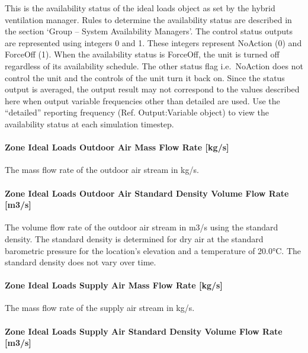 This is the availability status of the ideal loads object as set by the hybrid ventilation manager. Rules to determine the availability status are described in the section `Group -- System Availability Managers'. The control status outputs are represented using integers 0 and 1. These integers represent NoAction (0) and ForceOff (1). When the availability status is ForceOff, the unit is turned off regardless of its availability schedule. The other status flag i.e.~NoAction does not control the unit and the controls of the unit turn it back on. Since the status output is averaged, the output result may not correspond to the values described here when output variable frequencies other than detailed are used. Use the ``detailed'' reporting frequency (Ref. Output:Variable object) to view the availability status at each simulation timestep.

\paragraph{Zone Ideal Loads Outdoor Air Mass Flow Rate {[}kg/s{]}}\label{zone-ideal-loads-outdoor-air-mass-flow-rate-kgs}

The mass flow rate of the outdoor air stream in kg/s.

\paragraph{Zone Ideal Loads Outdoor Air Standard Density Volume Flow Rate {[}m3/s{]}}\label{zone-ideal-loads-outdoor-air-standard-density-volume-flow-rate-m3s}

The volume flow rate of the outdoor air stream in m3/s using the standard density. The standard density is determined for dry air at the standard barometric pressure for the location's elevation and a temperature of 20.0\si{\degreeCelsius}. The standard density does not vary over time.

\paragraph{Zone Ideal Loads Supply Air Mass Flow Rate {[}kg/s{]}}\label{zone-ideal-loads-supply-air-mass-flow-rate-kgs}

The mass flow rate of the supply air stream in kg/s.

\paragraph{Zone Ideal Loads Supply Air Standard Density Volume Flow Rate {[}m3/s{]}}\label{zone-ideal-loads-supply-air-standard-density-volume-flow-rate-m3s}

